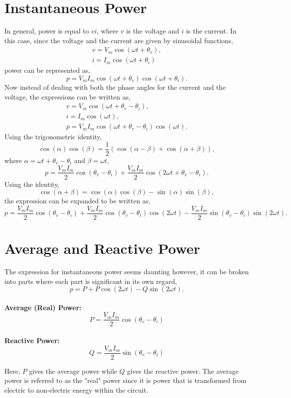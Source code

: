 \documentclass[12pt]{article}
\begin{document}
    \section*{Instantaneous Power}
    In general, power is equal to $vi$, where $v$ is the voltage and $i$ is the
    current. In this case, since the voltage and the current are given by
    sinusoidal functions,
    \begin{gather*}
        v = V_{m} \cos (\omega t + \theta_{v}), \\
        i = I_{m} \cos (\omega t + \theta_{i})
    \end{gather*}
    power can be represented as,
    \[
        p = V_{m}I_{m} \cos (\omega t + \theta_{v}) \cos (\omega t + \theta_{i})
    .\]
    Now instead of dealing with both the phase angles for the current and the
    voltage, the expressions can be written as,
    \begin{gather*}
        v = V_{m} \cos (\omega t + \theta_{v} - \theta_{i}), \\
        i = I_{m} \cos (\omega t), \\
        p = V_{m}I_{m} \cos (\omega t + \theta_{v} - \theta_{i}) \cos (\omega t)
    .\end{gather*}
    Using the trigonometric identity,
    \[
        \cos (\alpha) \cos (\beta) = \frac{1}{2} (\cos (\alpha - \beta) + \cos
        (\alpha + \beta))
    ,\]
    where $\alpha = \omega t + \theta_{v} - \theta_{i}$ and $\beta = \omega t$,
    \[
        p = \frac{V_{m} I_{m}}{2} \cos (\theta_{v} - \theta_{i}) + \frac{V_{m}
        I_{m}}{2} \cos (2 \omega t + \theta_{v} - \theta_{i})
    .\]
    Using the identity,
    \[
        \cos (\alpha + \beta) = \cos (\alpha) \cos (\beta) - \sin (\alpha) \sin
        (\beta)
    ,\]
    the expression can be expanded to be written as,
    \[
        \boxed{p = \frac{V_{m} I_{m}}{2} \cos (\theta_{v} - \theta_{i}) +
        \frac{V_{m} I_{m}}{2} \cos (\theta_{v} - \theta_{i}) \cos (2 \omega t) -
        \frac{V_{m} I_{m}}{2} \sin (\theta_{v} - \theta_{i}) \sin (2 \omega t).}
    \]
    \section*{Average and Reactive Power}
    The expression for instantaneous power seems daunting however, it can be
    broken into parts where each part is significant in its own regard,
    \[
        p = P + P \cos (2 \omega t) - Q \sin (2 \omega t)
    .\]
    \\ \textbf{Average (Real) Power:}
    \[
        P = \frac{V_{m} I_{m}}{2} \cos (\theta_{v} - \theta_{i})
    \]
    \\ \textbf{Reactive Power:}
    \[
        Q = \frac{V_{m} I_{m}}{2} \sin (\theta_{v} - \theta_{i})
    \]
    \newpage
    \par Here, $P$ gives the average power while $Q$ gives the reactive power.
    The average power is referred to as the "real" power since it is power that
    is transformed from electric to non-electric energy within the circuit.
\end{document}

